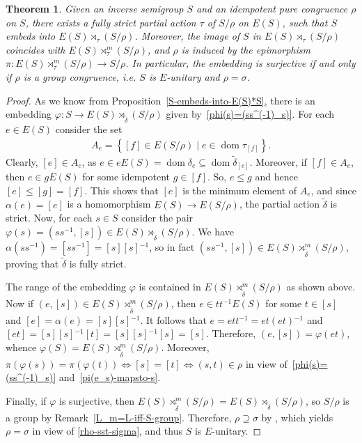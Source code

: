 \documentclass[reqno]{amsart}
\newtheorem{thrm}{Theorem}[section]
\theoremstyle{definition}
\renewcommand{\iff}{\Leftrightarrow}
\newcommand{\dom}[1]{\operatorname{\mathrm{dom}}{#1}}
\newcommand{\m}{{}^{-1}}
\newcommand{\0}{\theta}
\newcommand{\dt}{\delta}
\newcommand{\tl}{\tilde}
\newcommand{\sst}{\subseteq}
\newcommand{\rt}{\rtimes}
\begin{document}
\begin{thrm}\label{S-embeds-into-L-precise}
	Given an inverse semigroup $S$ and an idempotent pure congruence $\rho$ on $S$, there exists a fully strict partial action $\tau$ of $S/\rho$ on $E(S)$, such that $S$ embeds into $E(S)\rt_\tau(S/\rho)$. Moreover, the image of $S$ in $E(S)\rt_\tau(S/\rho)$ coincides with $E(S)\rt^m_\tau(S/\rho)$, and $\rho$ is induced by the epimorphism $\pi:E(S)\rt^m_\tau(S/\rho)\to S/\rho$. In particular, the embedding is surjective if and only if $\rho$ is a group congruence, i.e. $S$ is $E$-unitary and $\rho=\sigma$.
\end{thrm}
\begin{proof}
	As we know from Proposition~\ref{S-embeds-into-E(S)*S}, there is an embedding $\varphi:S\to E(S)\rt_{\tl\dt}(S/\rho)$ given by~\eqref{phi(s)=(ss^(-1)_s)}. For each $e\in E(S)$ consider the set 
	\begin{align*}
	A_e=\left\{[f]\in E(S/\rho)\mid e\in\dom{\tau_{[f]}}\right\}.
	\end{align*}
	Clearly, $[e]\in A_e$, as $e\in eE(S)=\dom{\dt_e}\sst\dom{\tl\dt_{[e]}}$. Moreover, if $[f]\in A_e$, then $e\in gE(S)$ for some idempotent $g\in[f]$. So, $e\le g$ and hence $[e]\le[g]=[f]$. This shows that $[e]$ is the minimum element of $A_e$, and since $\alpha(e)=[e]$ is a homomorphism $E(S)\to E(S/\rho)$, the partial action $\tl\dt$ is strict. Now, for each $s\in S$ consider the pair $\varphi(s)=(ss\m,[s])\in E(S)\rt_{\tl\dt}(S/\rho)$. We have $\alpha(ss\m)=[ss\m]=[s][s]\m$, so in fact $(ss\m,[s])\in E(S)\rt^m_{\tl\dt}(S/\rho)$, proving that $\tl\dt$ is fully strict.
	
	The range of the embedding $\varphi$ is contained in $E(S)\rt^m_{\tl\dt}(S/\rho)$ as shown above. Now if $(e,[s])\in E(S)\rt^m_{\tl\dt}(S/\rho)$, then $e\in tt\m E(S)$ for some $t\in[s]$ and $[e]=\alpha(e)=[s][s]\m$. It follows that $e=ett\m=et(et)\m$ and $[et]=[s][s]\m[t]=[s][s]\m[s]=[s]$. Therefore, $(e,[s])=\varphi(et)$, whence $\varphi(S)=E(S)\rt_{\tl\dt}^m(S/\rho)$. Moreover, $\pi(\varphi(s))=\pi(\varphi(t))\iff[s]=[t]\iff (s,t)\in\rho$ in view of~\eqref{phi(s)=(ss^(-1)_s)} and~\eqref{pi(e_s)-mapsto-s}.
	
	Finally, if $\varphi$ is surjective, then $E(S)\rt^m_{\tl\dt}(S/\rho)=E(S)\rt_{\tl\dt}(S/\rho)$, so $S/\rho$ is a group by Remark~\ref{L_m=L-iff-S-group}. Therefore, $\rho\supseteq\sigma$ by \cite[Theorem 2.4.1 (3)]{Lawson}, which yields $\rho=\sigma$ in view of \ref{rho-sst-sigma}, and thus $S$ is $E$-unitary. 
\end{proof}
\end{document}
